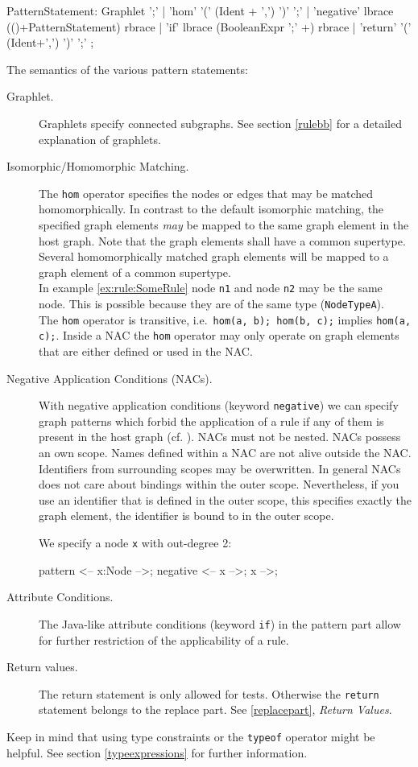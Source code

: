 \begin{rail}  
  PatternStatement: 
    Graphlet ';' |
    'hom' '(' (Ident + ',') ')' ';' |
    'negative' lbrace (()+PatternStatement) rbrace |
    'if' lbrace (BooleanExpr ';' +) rbrace |
    'return' '(' (Ident+',') ')' ';' ;
\end{rail}
The semantics of the various pattern statements:
\begin{description}
  \item[Graphlet.] Graphlets specify connected subgraphs. See section \ref{rulebb} for a detailed explanation of graphlets. 
  \item[Isomorphic/Homomorphic Matching.] The \texttt{hom} operator specifies the nodes or edges that may be matched homomorphically. In contrast to the default isomorphic matching, the specified graph elements \emph{may} be mapped to the same graph element in the host graph. Note that the graph elements shall have a common supertype. Several homomorphically matched graph elements will be mapped to a graph element of a common supertype.\\
  In example \ref{ex:rule:SomeRule} node \texttt{n1} and node \texttt{n2} may be the same node. This is possible because they are of the same type (\texttt{NodeTypeA}).\\
  The \texttt{hom} operator is transitive, i.e.\ \texttt{hom(a, b); hom(b, c);} implies \texttt{hom(a, c);}. 
  Inside a NAC the \texttt{hom} operator may only operate on graph elements that are either defined or used in the NAC.
  \item[Negative Application Conditions (NACs).] With negative application conditions (keyword \texttt{negative}) we can specify graph patterns which forbid the application of a rule if any of them is present in the host graph (cf. \cite{adam}). 
  NACs must not be nested.
  NACs possess an own scope. 
  Names defined within a NAC are not alive outside the NAC. 
  Identifiers from surrounding scopes may be overwritten.
  In general NACs does not care about bindings within the outer scope. 
  Nevertheless, if you use an identifier that is defined in the outer scope, this specifies exactly the graph element, the identifier is bound to in the outer scope.
  \begin{example}
    We specify a node \texttt{x} with out-degree 2:
    \begin{grgen}
pattern {
  <-- x:Node -->;
  negative {
    <-- x -->;
    x -->;
  }
}
    \end{grgen}
  \end{example}
  \item[Attribute Conditions.] The Java-like attribute conditions (keyword \texttt{if}) in the pattern part allow for further restriction of the applicability of a rule.
  \item[Return values.] The return statement is only allowed for tests. Otherwise the \texttt{return} statement belongs to the replace part. See \ref{replacepart}, \emph{Return Values}.
\end{description}
Keep in mind that using type constraints or the \texttt{typeof} operator might be helpful. See section \ref{typeexpressions} for further information.

